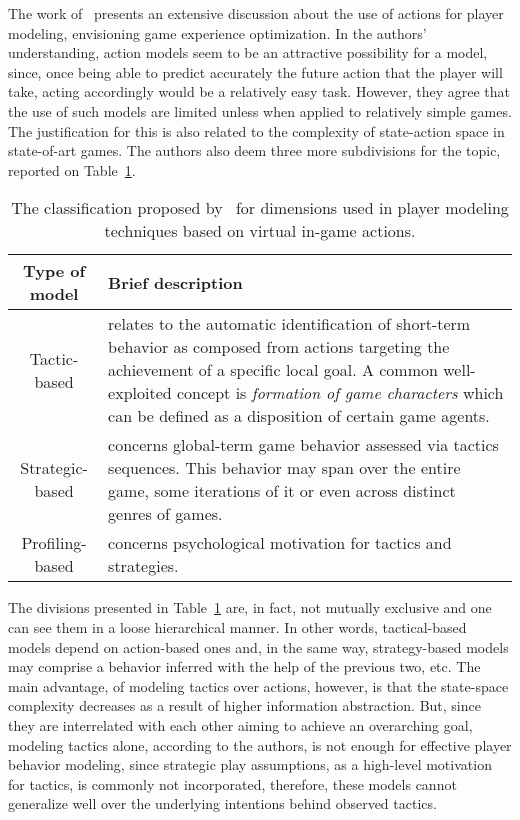 The work of~\cite{bakkes_player_2012} presents an extensive discussion about the use of actions for player modeling, envisioning game experience optimization. In the authors' understanding, action models seem to be an attractive possibility for a model, since, once being able to predict accurately the future action that the player will take, acting accordingly would be a relatively easy task. However, they agree that the use of such models are limited unless when applied to relatively simple games. The justification for this is also related to the complexity of state-action space in state-of-art games. The authors also deem three more subdivisions for the topic, reported on Table~\ref{actionModels}.

\begin{table}[!ht]
\centering
\caption{The classification proposed by~\cite{bakkes_player_2012} for dimensions used in player modeling techniques based on virtual in-game actions.}
\label{actionModels}
\begin{tabularx}{\textwidth}{|c|X|} \hline
\textbf{Type of model}&\textbf{Brief description}\\ \hline
Tactic-based & relates to the automatic identification of short-term behavior as composed from actions targeting the achievement of a specific local goal. A common well-exploited concept is \textit{formation of game characters} which can be defined as a disposition of certain game agents.\\ \hline
Strategic-based & concerns global-term game behavior assessed via tactics sequences. This behavior may span over the entire game, some iterations of it or even across distinct genres of games.\\ \hline
Profiling-based & concerns psychological motivation for tactics and strategies.\\ \hline
\end{tabularx}
\end{table}

The divisions presented in Table~\ref{actionModels} are, in fact, not mutually exclusive and one can see them in a loose hierarchical manner. In other words, tactical-based models depend on action-based ones and, in the same way, strategy-based models may comprise a behavior inferred with the help of the previous two, etc. The main advantage, of modeling tactics over actions, however, is that the state-space complexity decreases as a result of higher information abstraction. But, since they are interrelated with each other aiming to achieve an overarching goal, modeling tactics alone, according to the authors, is not enough for effective player behavior modeling, since strategic play assumptions, as a high-level motivation for tactics, is commonly not incorporated, therefore, these models cannot generalize well over the underlying intentions behind observed tactics.

